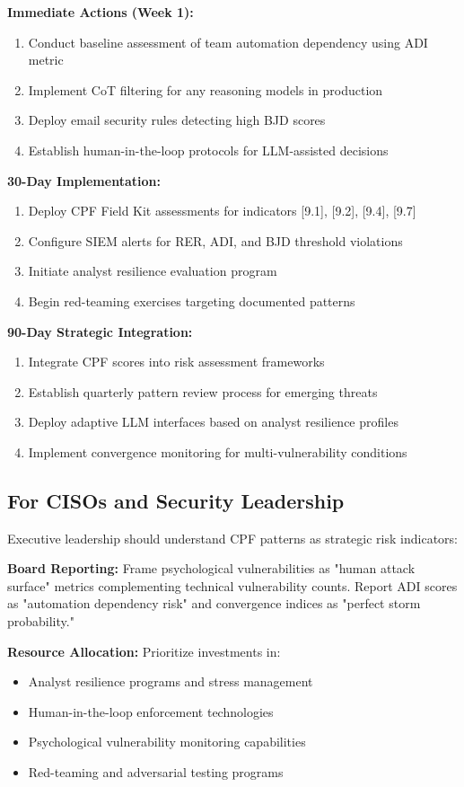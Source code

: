 \documentclass[11pt,a4paper]{article}
\begin{document}
\textbf{Immediate Actions (Week 1):}
\begin{enumerate}
\item Conduct baseline assessment of team automation dependency using ADI metric
\item Implement CoT filtering for any reasoning models in production
\item Deploy email security rules detecting high BJD scores
\item Establish human-in-the-loop protocols for LLM-assisted decisions
\end{enumerate}

\textbf{30-Day Implementation:}
\begin{enumerate}
\item Deploy CPF Field Kit assessments for indicators [9.1], [9.2], [9.4], [9.7]
\item Configure SIEM alerts for RER, ADI, and BJD threshold violations
\item Initiate analyst resilience evaluation program
\item Begin red-teaming exercises targeting documented patterns
\end{enumerate}

\textbf{90-Day Strategic Integration:}
\begin{enumerate}
\item Integrate CPF scores into risk assessment frameworks
\item Establish quarterly pattern review process for emerging threats
\item Deploy adaptive LLM interfaces based on analyst resilience profiles
\item Implement convergence monitoring for multi-vulnerability conditions
\end{enumerate}

\subsection{For CISOs and Security Leadership}

Executive leadership should understand CPF patterns as strategic risk indicators:

\textbf{Board Reporting:} Frame psychological vulnerabilities as "human attack surface" metrics complementing technical vulnerability counts. Report ADI scores as "automation dependency risk" and convergence indices as "perfect storm probability."

\textbf{Resource Allocation:} Prioritize investments in:
\begin{itemize}
\item Analyst resilience programs and stress management
\item Human-in-the-loop enforcement technologies
\item Psychological vulnerability monitoring capabilities
\item Red-teaming and adversarial testing programs
\end{itemize}
\end{document}
